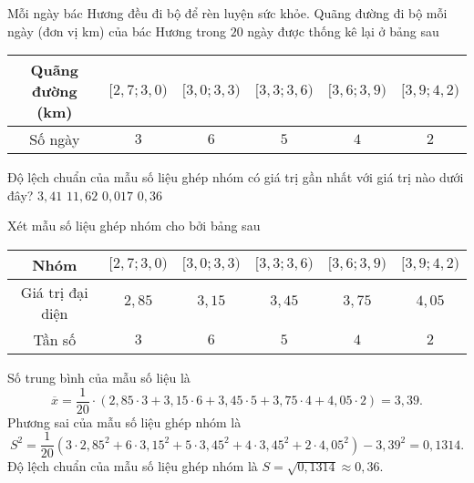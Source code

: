 \begin{ex}%
	Mỗi ngày bác Hương đều đi bộ để rèn luyện sức khỏe. Quãng đường đi bộ mỗi ngày (đơn vị km) của bác Hương trong $20$ ngày được thống kê lại ở bảng sau
	\begin{center}
		\begin{tabular}{|c|c|c|c|c|c|}
			\hline
			Quãng đường (km) & $[2{,}7;3{,}0)$ & $[3{,}0;3{,}3)$ & $[3{,}3;3{,}6)$ & $[3{,}6;3{,}9)$ & $[3{,}9;4{,}2)$ \\
			\hline
			Số ngày          & $3$             & $6$             & $5$             & $4$             & $2$             \\
			\hline
		\end{tabular}
	\end{center}
	Độ lệch chuẩn của mẫu số liệu ghép nhóm có giá trị gần nhất với giá trị nào dưới đây?
	\choice
	{$3{,}41$}
	{$11{,}62$}
	{$0{,}017$}
	{\True $0{,}36$}
	\loigiai
	{
	Xét mẫu số liệu ghép nhóm cho bởi bảng sau
	\begin{center}
		\begin{tabular}{|c|c|c|c|c|c|}
			\hline
			Nhóm             & $[2{,}7;3{,}0)$ & $[3{,}0;3{,}3)$ & $[3{,}3;3{,}6)$ & $[3{,}6;3{,}9)$ & $[3{,}9;4{,}2)$ \\
			\hline
			Giá trị đại diện & $2{,}85$        & $3{,}15$        & $3{,}45$        & $3{,}75$        & $4{,}05$        \\
			\hline
			Tần số           & $3$             & $6$             & $5$             & $4$             & $2$             \\
			\hline
		\end{tabular}
	\end{center}
	Số trung bình của mẫu số liệu là
	$$\overline{x}=\dfrac{1}{20}\cdot (2{,}85\cdot 3+3{,}15\cdot 6+3{,}45\cdot 5+3{,}75\cdot 4+4{,}05\cdot 2)=3{,}39.$$
	Phương sai của mẫu số liệu ghép nhóm là
	$$S^2=\dfrac{1}{20}\left(3\cdot 2{,}85^2+6\cdot 3{,}15^2+5\cdot 3{,}45^2+4\cdot 3{,}45^2+2\cdot 4{,}05^2\right)-3{,}39^2=0{,}1314.$$
	Độ lệch chuẩn của mẫu số liệu ghép nhóm là $S=\sqrt{0{,}1314}\approx 0{,}36$.
	}
\end{ex}

